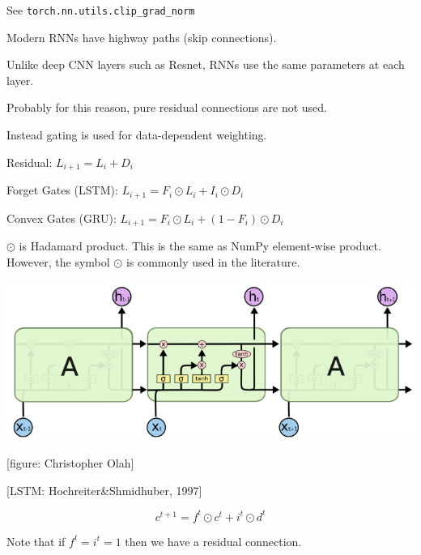 {\vfill
See {\tt torch.nn.utils.clip\_grad\_norm}


Modern RNNs have highway paths (skip connections).

\vfill
Unlike deep CNN layers such as Resnet, RNNs use the same parameters at each layer.

\vfill
Probably for this reason, pure residual connections are not used.

\vfill
Instead gating is used for data-dependent weighting.


Residual: \hspace{5em} $L_{i+1} = L_i + D_i$

\vfill
Forget Gates (LSTM): \hspace{2em} $L_{i+1} = F_i \odot L_i + I_i \odot D_i$

\vfill
Convex Gates (GRU):\hspace{1em} $L_{i+1} = F_i\odot L_i + (1-F_i) \odot D_i$

\vfill
$\odot$ is Hadamard product. This is the same as NumPy element-wise product.  However, the symbol $\odot$ is commonly used in the literature.


\centerline{\includegraphics[width=6.0in]{../images/LSTM}}
\centerline{{\large [figure: Christopher Olah]}}

\centerline{\Large [LSTM: Hochreiter\&Shmidhuber, 1997]}

\bigskip
\bigskip
$$c^{t+1} = f^t \odot c^t + i^t \odot d^t$$

\bigskip
\bigskip
Note that if $f^t = i^t = 1$ then we have a residual connection.


}
